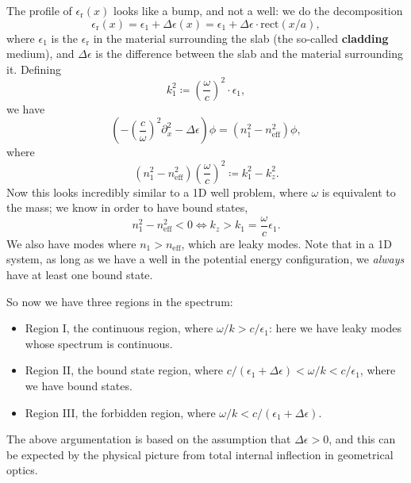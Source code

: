 \documentclass[hyperref, a4paper]{article}
\newcommand*{\concept}[1]{{\textbf{#1}}}
\newcommand{\epsr}{\epsilon_{\text{r}}}
\begin{document}
The profile of $\epsr(x)$ looks like a bump, 
and not a well: 
we do the decomposition 
\begin{equation}
    \epsr(x) = \epsilon_1 + \Delta \epsilon(x)
    = \epsilon_1 + \Delta \epsilon \cdot \mathrm{rect}(x/a),
\end{equation}
where $\epsilon_1$ is the $\epsr$ in the material surrounding the slab
(the so-called \concept{cladding} medium), 
and $\Delta \epsilon$ is the difference
between the slab and the material surrounding it.
Defining 
\begin{equation}
    k_1^2 \coloneqq \left(\frac{\omega}{c}\right)^2 \cdot \epsilon_1,
\end{equation}
we have 
\begin{equation}
    \left(
        - \left(\frac{c}{\omega}\right)^2 \partial_x^2 - \Delta \epsilon 
    \right) \phi
    = (n_1^2 - n_\text{eff}^2) \phi,
\end{equation}
where 
\begin{equation}
    (n_1^2 - n_\text{eff}^2) \left(\frac{\omega}{c}\right)^2 \coloneqq k_1^2 - k_z^2.
\end{equation}
Now this looks incredibly similar to a 1D well problem, 
where $\omega$ is equivalent to the mass; 
we know in order to have bound states, 
\begin{equation}
    n_1^2 - n_{\text{eff}}^2 < 0 \Leftrightarrow 
    k_z > k_1 = \frac{\omega}{c} \epsilon_1.
\end{equation}
We also have modes where $n_1 > n_{\text{eff}}$, which are leaky modes.
Note that in a 1D system, 
as long as we have a well in the potential energy configuration,
we \emph{always} have at least one bound state.

So now we have three regions in the spectrum:
\begin{itemize}
    \item Region I, the continuous region,
    where $\omega / k > c / \epsilon_1$: here we have leaky modes whose spectrum is continuous.
    \item Region II, the bound state region, 
    where $c / (\epsilon_1 + \Delta \epsilon) < \omega / k < c / \epsilon_1$,
    where we have bound states.
    \item Region III, the forbidden region,
    where $\omega / k < c / (\epsilon_1 + \Delta \epsilon)$. 
\end{itemize}
The above argumentation is based on the assumption that $\Delta \epsilon > 0$,
and this can be expected by the physical picture from total internal inflection in geometrical optics. 
\end{document}
